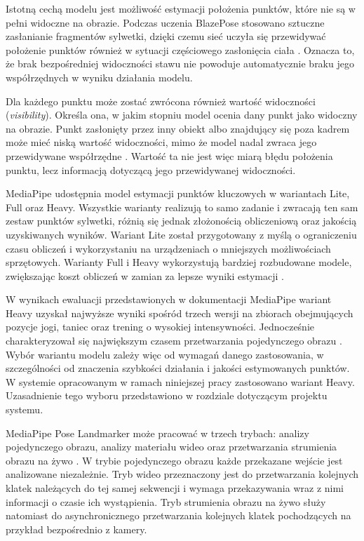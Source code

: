 Istotną cechą modelu jest możliwość estymacji położenia punktów, które nie są w pełni widoczne na obrazie. Podczas uczenia BlazePose stosowano sztuczne zasłanianie fragmentów sylwetki, dzięki czemu sieć uczyła się przewidywać położenie punktów również w sytuacji częściowego zasłonięcia ciała \cite{bazarevsky2020blazepose}. Oznacza to, że brak bezpośredniej widoczności stawu nie powoduje automatycznie braku jego współrzędnych w wyniku działania modelu.

Dla każdego punktu może zostać zwrócona również wartość widoczności (\textit{visibility}). Określa ona, w jakim stopniu model ocenia dany punkt jako widoczny na obrazie. Punkt zasłonięty przez inny obiekt albo znajdujący się poza kadrem może mieć niską wartość widoczności, mimo że model nadal zwraca jego przewidywane współrzędne \cite{mediapipe_pose_landmarker}. Wartość ta nie jest więc miarą błędu położenia punktu, lecz informacją dotyczącą jego przewidywanej widoczności.

MediaPipe udostępnia model estymacji punktów kluczowych w wariantach Lite, Full oraz Heavy. Wszystkie warianty realizują to samo zadanie i zwracają ten sam zestaw punktów sylwetki, różnią się jednak złożonością obliczeniową oraz jakością uzyskiwanych wyników. Wariant Lite został przygotowany z myślą o ograniczeniu czasu obliczeń i wykorzystaniu na urządzeniach o mniejszych możliwościach sprzętowych. Warianty Full i Heavy wykorzystują bardziej rozbudowane modele, zwiększając koszt obliczeń w zamian za lepsze wyniki estymacji \cite{mediapipe_pose_docs}.

W wynikach ewaluacji przedstawionych w dokumentacji MediaPipe wariant Heavy uzyskał najwyższe wyniki spośród trzech wersji na zbiorach obejmujących pozycje jogi, taniec oraz trening o wysokiej intensywności. Jednocześnie charakteryzował się największym czasem przetwarzania pojedynczego obrazu \cite{mediapipe_pose_docs}. Wybór wariantu modelu zależy więc od wymagań danego zastosowania, w szczególności od znaczenia szybkości działania i jakości estymowanych punktów. W systemie opracowanym w ramach niniejszej pracy zastosowano wariant Heavy. Uzasadnienie tego wyboru przedstawiono w rozdziale dotyczącym projektu systemu.

MediaPipe Pose Landmarker może pracować w trzech trybach: analizy pojedynczego obrazu, analizy materiału wideo oraz przetwarzania strumienia obrazu na żywo \cite{mediapipe_pose_landmarker}. W trybie pojedynczego obrazu każde przekazane wejście jest analizowane niezależnie. Tryb wideo przeznaczony jest do przetwarzania kolejnych klatek należących do tej samej sekwencji i wymaga przekazywania wraz z nimi informacji o czasie ich wystąpienia. Tryb strumienia obrazu na żywo służy natomiast do asynchronicznego przetwarzania kolejnych klatek pochodzących na przykład bezpośrednio z kamery.

